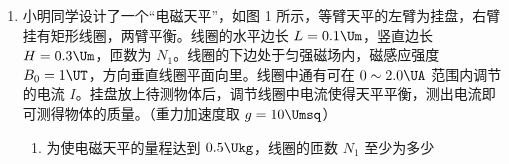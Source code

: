 \documentclass[\gkver]{gaokaozhenti}
\begin{document}
\begin{enumerate}
\begin{enumerate}
	\item
	求 $\theta$ 角增大到多少时，物块能从斜面开始下滑；（用正切值表示）

	\item
	当 $\theta$ 增大到 $37^\circ$ 时，物块恰能停在桌面边缘，求物块与桌面间的动摩擦因数 $\mu_{2}$（已知 $\sin37^\circ=0.6$，$\cos37^\circ=0.8$）

	\item
	继续增大 $\theta$ 角，发现 $\theta=53^\circ$ 时物块落地点与墙面的距离最大，求此最大距离 $x_{m}$。
\end{enumerate}



\item
小明同学设计了一个“电磁天平”，如图 1 所示，等臂天平的左臂为挂盘，右臂挂有矩形线圈，两臂平衡。线圈的水平边长 $L=0.1\Um$，竖直边长 $H=0.3\Um$，匝数为 $N_{1}$。线圈的下边处于匀强磁场内，磁感应强度 $B_{0}=1\UT$，方向垂直线圈平面向里。线圈中通有可在 $0\sim2.0\UA$ 范围内调节的电流 $I$。挂盘放上待测物体后，调节线圈中电流使得天平平衡，测出电流即可测得物体的质量。（重力加速度取 $g=10\Umsq$）

\begin{enumerate}
	\item
	为使电磁天平的量程达到 $0.5\Ukg$，线圈的匝数 $N_{1}$ 至少为多少


\end{enumerate}
\end{enumerate}
\end{document}
